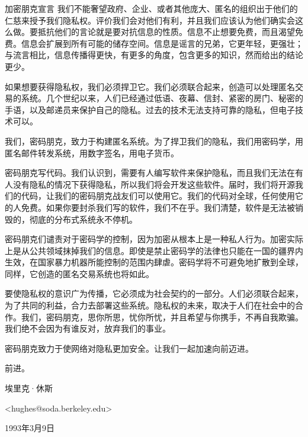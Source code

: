 \documentclass[11pt]{beamer}
\begin{document}
\begin{frame}[allowframebreaks]{加密朋克宣言}
	我们不能奢望政府、企业、或者其他庞大、匿名的组织出于他们的仁慈来授予我们隐私权。评价我们会对他们有利，并且我们应该认为他们确实会这么做。要抵抗他们的言论就是要对抗信息的性质。信息不止想要免费，而且渴望免费。信息会扩展到所有可能的储存空间。信息是谣言的兄弟，它更年轻，更强壮；与流言相比，信息传播得更快，有更多的角度，包含更多的知识，然而给出的结论更少。
	
	如果想要获得隐私权，我们必须捍卫它。{\color{red}我们必须联合起来，创造可以处理匿名交易的系统}。几个世纪以来，人们已经通过低语、夜幕、信封、紧密的房门、秘密的手语，以及邮递员来保护自己的隐私。过去的技术无法支持可靠的隐私，但电子技术可以。
	
	{\color{red}我们，密码朋克，致力于构建匿名系统。为了捍卫我们的隐私，我们用密码学，用匿名邮件转发系统，用数字签名，用电子货币}。
	
	密码朋克写代码。我们认识到，需要有人编写软件来保护隐私，而且我们无法在有人没有隐私的情况下获得隐私，所以我们将会开发这些软件。届时，我们将开源我们的代码，让我们的密码朋克战友们可以使用它。我们的代码对全球，任何使用它的人免费。如果你要封杀我们写的软件，我们不在乎。{\color{red}我们清楚，软件是无法被销毁的，彻底的分布式系统永不停机}。
	
	密码朋克们谴责对于密码学的控制，因为加密从根本上是一种私人行为。加密实际上是从公共领域抹掉我们的信息。即使是禁止密码学的法律也只能在一国的疆界内生效，在国家暴力机器所能控制的范围内肆虐。{\color{red}密码学将不可避免地扩散到全球，同样，它创造的匿名交易系统也将如此}。
	
	要使隐私权的意识广为传播，它必须成为社会契约的一部分。{\color{red}人们必须联合起来，为了共同的利益，合力去部署这些系统}。隐私权的未来，取决于人们在社会中的合作。我们，密码朋克，思你所思，忧你所忧，并且希望与你携手，不再自我欺骗。我们绝不会因为有谁反对，放弃我们的事业。
	
	密码朋克致力于使网络对隐私更加安全。让我们一起加速向前迈进。
	
	前进。
	
	埃里克·休斯
	
	<hughes@soda.berkeley.edu>
	
	1993年3月9日
	
\end{frame}
\end{document}
